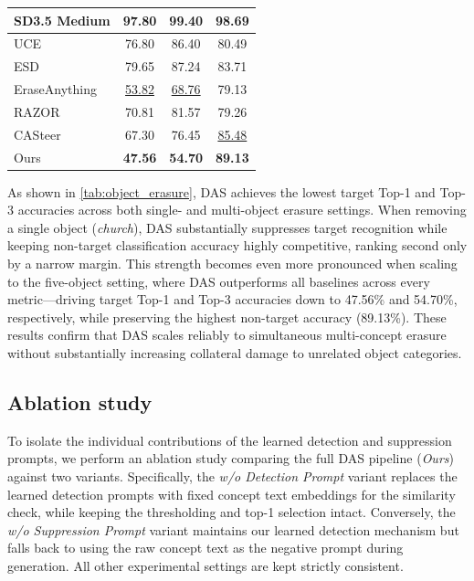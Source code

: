 \begin{table}[!htbp]
\begin{subtable}{\columnwidth}
\begin{tabular}{@{}lccc@{}}
            SD3.5 Medium & 97.80  & 99.40 & 98.69 \\
            \midrule
            UCE & 76.80 & 86.40 & 80.49 \\ 
            ESD & 79.65 & 87.24 & 83.71 \\ 
            EraseAnything & \underline{53.82} & \underline{68.76} & 79.13 \\
            RAZOR & 70.81 & 81.57 & 79.26 \\
            CASteer & 67.30 & 76.45 & \underline{85.48} \\ 
            \midrule
            Ours & \textbf{47.56} & \textbf{54.70} & \textbf{89.13} \\
            \bottomrule
        \end{tabular}
    \end{subtable}
\end{table}

As shown in \cref{tab:object_erasure}, DAS achieves the lowest target Top-1 and Top-3 accuracies across both single- and multi-object erasure settings. 
When removing a single object (\textit{church}), DAS substantially suppresses target recognition while keeping non-target classification accuracy highly competitive, ranking second only by a narrow margin. 
This strength becomes even more pronounced when scaling to the five-object setting, where DAS outperforms all baselines across every metric—driving target Top-1 and Top-3 accuracies down to 47.56\% and 54.70\%, respectively, while preserving the highest non-target accuracy (89.13\%). 
These results confirm that DAS scales reliably to simultaneous multi-concept erasure without substantially increasing collateral damage to unrelated object categories.
\subsection{Ablation study}
\label{sec:exp_ablation}

To isolate the individual contributions of the learned detection and suppression prompts, we perform an ablation study comparing the full DAS pipeline (\textit{Ours}) against two variants. 
Specifically, the \textit{w/o Detection Prompt} variant replaces the learned detection prompts with fixed concept text embeddings for the similarity check, while keeping the thresholding and top-1 selection intact. 
Conversely, the \textit{w/o Suppression Prompt} variant maintains our learned detection mechanism but falls back to using the raw concept text as the negative prompt during generation. 
All other experimental settings are kept strictly consistent.

